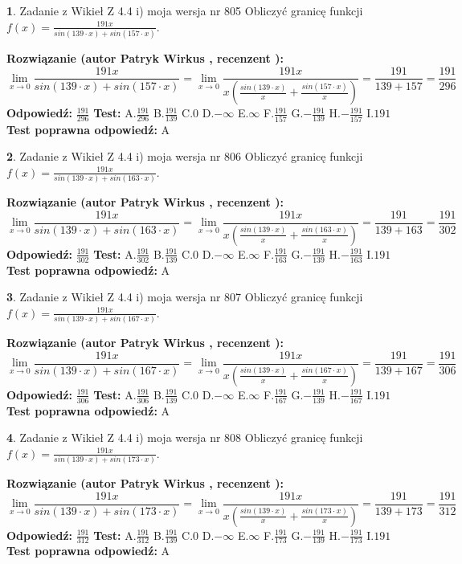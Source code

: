 \documentclass[12pt, a4paper]{article}
\theoremstyle{definition} %
\newtheorem{zad}{}
\newcommand{\zadStart}[1]{\begin{zad}#1\newline}
\newcommand{\zadStop}{\end{zad}}
\newcommand{\rozwStart}[2]{\noindent \textbf{Rozwiązanie (autor #1 , recenzent #2): }\newline}
\newcommand{\rozwStop}{\newline}
\newcommand{\odpStart}{\noindent \textbf{Odpowiedź:}\newline}
\newcommand{\odpStop}{\newline}
\newcommand{\testStart}{\noindent \textbf{Test:}\newline}
\newcommand{\testStop}{\newline}
\newcommand{\kluczStart}{\noindent \textbf{Test poprawna odpowiedź:}\newline}
\newcommand{\kluczStop}{\newline}
\begin{document}
\zadStart{Zadanie z Wikieł Z 4.4 i) moja wersja nr 805}
Obliczyć granicę funkcji $f(x)=\frac{191x}{sin(139\cdot x) +sin(157\cdot x)}$.
\zadStop
\rozwStart{Patryk Wirkus}{}
$$\lim\limits_{x\to 0}\frac{191x}{sin(139\cdot x) +sin(157\cdot x)}=\lim\limits_{x\to 0}\frac{191x}{x(\frac{sin(139\cdot x)}{x}+\frac{sin(157\cdot x)}{x})}=\frac{191}{139+157} = \frac{191}{296}$$
\rozwStop
\odpStart
$\frac{191}{296}$
\odpStop
\testStart
A.$\frac{191}{296}$
B.$\frac{191}{139}$
C.$0$
D.$-\infty$
E.$\infty$
F.$\frac{191}{157}$
G.$-\frac{191}{139}$
H.$-\frac{191}{157}$
I.$191$
\testStop
\kluczStart
A
\kluczStop



\zadStart{Zadanie z Wikieł Z 4.4 i) moja wersja nr 806}
Obliczyć granicę funkcji $f(x)=\frac{191x}{sin(139\cdot x) +sin(163\cdot x)}$.
\zadStop
\rozwStart{Patryk Wirkus}{}
$$\lim\limits_{x\to 0}\frac{191x}{sin(139\cdot x) +sin(163\cdot x)}=\lim\limits_{x\to 0}\frac{191x}{x(\frac{sin(139\cdot x)}{x}+\frac{sin(163\cdot x)}{x})}=\frac{191}{139+163} = \frac{191}{302}$$
\rozwStop
\odpStart
$\frac{191}{302}$
\odpStop
\testStart
A.$\frac{191}{302}$
B.$\frac{191}{139}$
C.$0$
D.$-\infty$
E.$\infty$
F.$\frac{191}{163}$
G.$-\frac{191}{139}$
H.$-\frac{191}{163}$
I.$191$
\testStop
\kluczStart
A
\kluczStop



\zadStart{Zadanie z Wikieł Z 4.4 i) moja wersja nr 807}
Obliczyć granicę funkcji $f(x)=\frac{191x}{sin(139\cdot x) +sin(167\cdot x)}$.
\zadStop
\rozwStart{Patryk Wirkus}{}
$$\lim\limits_{x\to 0}\frac{191x}{sin(139\cdot x) +sin(167\cdot x)}=\lim\limits_{x\to 0}\frac{191x}{x(\frac{sin(139\cdot x)}{x}+\frac{sin(167\cdot x)}{x})}=\frac{191}{139+167} = \frac{191}{306}$$
\rozwStop
\odpStart
$\frac{191}{306}$
\odpStop
\testStart
A.$\frac{191}{306}$
B.$\frac{191}{139}$
C.$0$
D.$-\infty$
E.$\infty$
F.$\frac{191}{167}$
G.$-\frac{191}{139}$
H.$-\frac{191}{167}$
I.$191$
\testStop
\kluczStart
A
\kluczStop



\zadStart{Zadanie z Wikieł Z 4.4 i) moja wersja nr 808}
Obliczyć granicę funkcji $f(x)=\frac{191x}{sin(139\cdot x) +sin(173\cdot x)}$.
\zadStop
\rozwStart{Patryk Wirkus}{}
$$\lim\limits_{x\to 0}\frac{191x}{sin(139\cdot x) +sin(173\cdot x)}=\lim\limits_{x\to 0}\frac{191x}{x(\frac{sin(139\cdot x)}{x}+\frac{sin(173\cdot x)}{x})}=\frac{191}{139+173} = \frac{191}{312}$$
\rozwStop
\odpStart
$\frac{191}{312}$
\odpStop
\testStart
A.$\frac{191}{312}$
B.$\frac{191}{139}$
C.$0$
D.$-\infty$
E.$\infty$
F.$\frac{191}{173}$
G.$-\frac{191}{139}$
H.$-\frac{191}{173}$
I.$191$
\testStop
\kluczStart
A
\kluczStop
\end{document}

